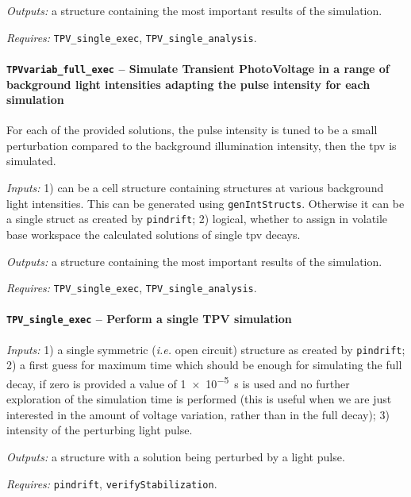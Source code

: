 		\textit{Outputs:} a structure containing the most important results of the simulation.
		
		\textit{Requires:} \texttt{TPV\_single\_exec}, \texttt{TPV\_single\_analysis}.
		
		
		
				\paragraph{\texttt{TPVvariab\_full\_exec} -- Simulate Transient PhotoVoltage in a range of background light intensities adapting the pulse intensity for each simulation}
				For each of the provided solutions, the pulse intensity is tuned to be a small perturbation compared to the background illumination intensity, then the \gls{tpv} is simulated.
				
				\textit{Inputs:} 1) can be a cell structure containing structures at various background
				light intensities. This can be generated using \texttt{gen\-Int\-Structs}.
				Otherwise it can be a single struct as created by \texttt{pindrift};
				2) logical, whether to assign in volatile base
				workspace the calculated solutions of single \gls{tpv} decays.
				
				\textit{Outputs:} a structure containing the most important results of the simulation.
				
				\textit{Requires:} \texttt{TPV\_single\_exec}, \texttt{TPV\_single\_analysis}.
		
		
		\paragraph{\texttt{TPV\_single\_exec} -- Perform a single TPV simulation}
		
		\textit{Inputs:} 1) a single symmetric (\textsl{i.e.} open circuit) structure as created by \texttt{pindrift};
		2) a first guess for maximum time which should be enough for simulating the full decay, if zero is provided a value of \SI{1e-5}{\s} is used and no further exploration of the simulation time is performed (this is useful when we are just interested in the amount of voltage variation, rather than in the full decay);
		3) intensity of the perturbing light pulse.
		
		\textit{Outputs:} a structure with a solution being perturbed by a light pulse.
		
		\textit{Requires:} \texttt{pindrift}, \texttt{verify\-Stabilization}.
		
